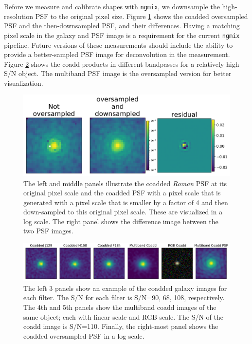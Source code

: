 \documentclass[fleqn,usenatbib]{mnras}
\begin{document}
Before we measure and calibrate shapes with \texttt{ngmix}, we downsample the high-resolution PSF to the original pixel size. Figure \ref{fig:coadd_oversample_res} shows the coadded oversampled PSF and the then-downsampled PSF, and their differences. Having a matching pixel scale in the galaxy and PSF image is a requirement for the current \texttt{ngmix} pipeline. Future versions of these measurements should include the ability to provide a better-sampled PSF image for deconvolution in the measurement. Figure \ref{fig:single_to_coadd_rgb} shows the coadd products in different bandpasses for a relatively high S/N object. The multiband PSF image is the oversampled version for better visualization. 


\begin{figure}
	\includegraphics[width=\columnwidth]{psf_differences.pdf}
    \caption{The left and middle panels illustrate the coadded \emph{Roman} PSF at its original pixel scale and the coadded PSF with a pixel scale that is generated with a pixel scale that is smaller by a factor of 4 and then down-sampled to this original pixel scale. These are visualized in a log scale. The right panel shows the difference image between the two PSF images. }
    \label{fig:coadd_oversample_res}
\end{figure}


\begin{figure}
	\includegraphics[width=\textwidth]{coadd_galaxy_example_log.pdf}
    \caption{The left 3 panels show an example of the coadded galaxy images for each filter. The S/N for each filter is S/N=90, 68, 108, respectively. The 4th and 5th panels show the multiband coadd images of the same object; each with linear scale and RGB scale. The S/N of the coadd image is S/N=110. Finally, the right-most panel shows the coadded oversampled PSF in a log scale.}
    \label{fig:single_to_coadd_rgb}
\end{figure}
\end{document}
